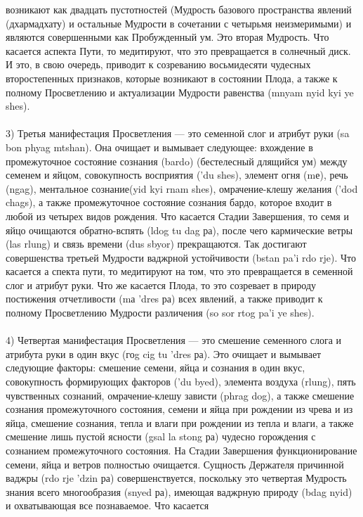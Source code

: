 возникают как двадцать пустотностей (Мудрость базового пространства явлений
(дхармадхату) и остальные Мудрости в сочетании с четырьмя неизмеримыми) и являются
совершенными как Пробужденный ум. Это вторая Мудрость. Что касается аспекта Пути, то
медитируют, что это превращается в солнечный диск. И это, в свою очередь, приводит к
созреванию восьмидесяти чудесных второстепенных признаков, которые возникают в
состоянии Плода, а также к полному Просветлению и актуализации Мудрости равенства
(mnyam nyid kyi ye shes).\\
\\
3) Третья манифестация Просветления — это семенной слог и атрибут руки (sa bon
phyag mtshan). Она очищает и вымывает следующее: вхождение в промежуточное состояние
сознания (bardo) (бестелесный длящийся ум) между семенем и яйцом, совокупность
восприятия ('du shes), элемент огня (mе), речь (ngag), ментальное сознание(yid kyi rnam shes),
омрачение-клешу желания ('dod chags), а также промежуточное состояние сознания бардо,
которое входит в любой из четырех видов рождения. Что касается Стадии Завершения, то
семя и яйцо очищаются обратно-вспять (ldog tu dag ра), после чего кармические ветры (las
rlung) и связь времени (dus sbyor) прекращаются. Так достигают совершенства третьей
Мудрости ваджрной устойчивости (bstan pa'i rdo rje). Что касается а спекта пути, то
медитируют на том, что это превращается в семенной слог и атрибут руки. Что же касается
Плода, то это созревает в природу постижения отчетливости (mа 'dres ра) всех явлений, а
также приводит к полному Просветлению Мудрости различения (so sor rtog  pa'i ye shes).\\
\\
4) Четвертая манифестация Просветления — это смешение семенного слога и
атрибута руки в один вкус (гоg cig tu 'dres ра). Это очищает и вымывает следующие факторы:
смешение семени, яйца и сознания в один вкус, совокупность формирующих факторов ('du
byed), элемента воздуха (rlung), пять чувственных сознаний, омрачение-клешу зависти (phrag
dog), а также смешение сознания промежуточного состояния, семени и яйца при рождении
из чрева и из яйца, смешение сознания, тепла и влаги при рождении из тепла и влаги, а также
смешение лишь пустой ясности (gsal la stong ра) чудесно горождения с сознанием
промежуточного состояния. На Стадии Завершения функционирование семени, яйца и
ветров полностью очищается. Сущность Держателя причинной ваджры (rdo rje 'dzin ра)
совершенствуется, поскольку это четвертая Мудрость знания всего многообразия (snyed
ра), имеющая ваджрную природу (bdag nyid) и охватывающая все познаваемое. Что касается
